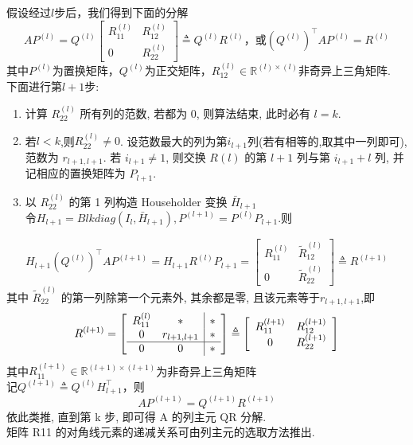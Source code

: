 \documentclass[12pt,a4paper]{article}
\begin{document}
假设经过$l$步后，我们得到下面的分解
$$
A P^{(l)}=Q^{(l)}\left[\begin{array}{cc}{R_{11}^{(l)}} & {R_{12}^{(l)}} \\ {0} & {R_{22}^{(l)}}\end{array}\right] \triangleq Q^{(l)} R^{(l)}，或 \left(Q^{(l)}\right)^{\top} A P^{(l)}=R^{(l)}
$$
其中$P^(l)$为置换矩阵，$Q^(l)$为正交矩阵，$R_{12}^{(l)} \in \mathbb{R}^{(l) \times(l)}$非奇异上三角矩阵.\\
下面进行第$l+1$步:
\begin{enumerate}
	\item 计算 $R_{22}^{(l)}$ 所有列的范数, 若都为 0, 则算法结束, 此时必有 $l = k$.
	\item 若$l < k$,则$R_{22}^{(l)}\ne 0$. 设范数最大的列为第$i_{l+1}$列(若有相等的,取其中一列即可), 范数为 $r_{l+1,l+1}$. 若 $i_{l+1}\ne 1$, 则交换 $R(l)$ 的第 $l + 1$ 列与第 $i_{l+1} + l$ 列, 并记相应的置换矩阵为 $P_{l+1}$.
	\item 以 $R_{22}^{(l)}$ 的第 1 列构造 Householder 变换 $\bar{H}_{l+1}$\\
	令$H_{l+1}=Blkdiag(I_{l},\bar{H}_{l+1}),P^{(l+1)}=P^{(l)} P_{l+1}$.则
\end{enumerate}
$$
H_{l+1}\left(Q^{(l)}\right)^{\top} A P^{(l+1)}=H_{l+1} R^{(l)} P_{l+1}=\left[\begin{array}{cc}{R_{11}^{(l)}} & {\tilde{R}_{12}^{(l)}} \\ {0} & {\tilde{R}_{22}^{(l)}}\end{array}\right] \triangleq R^{(l+1)}
$$
其中 $\tilde {R}_{22}^{(l)}$ 的第一列除第一个元素外, 其余都是零, 且该元素等于$r_{l+1,l+1}$,即
$$
R^{(l+1)}=\left[\begin{array}{c c |c c}{R_{11}^{(l)}} & {*} & {*} \\ {0} & {r_{l+1, l+1}} & {*} \\ \hline {0} & {0} & {*}\end{array}\right] \triangleq\left[\begin{array}{cc}{R_{11}^{(l+1)}} & {R_{12}^{(l+1)}} \\ {0} & {R_{22}^{(l+1)}}\end{array}\right]
$$
其中$R_{11}^{(l+1)} \in \mathbb{R}^{(l+1) \times(l+1)}$为非奇异上三角矩阵\\
记$Q^{(l+1)} \triangleq Q^{(l)} H_{l+1}^{\top}$，则
$$
A P^{(l+1)}=Q^{(l+1)} R^{(l+1)}
$$
依此类推, 直到第 k 步, 即可得 A 的列主元 QR 分解.\\
矩阵 R11 的对角线元素的递减关系可由列主元的选取方法推出.
\end{document}

